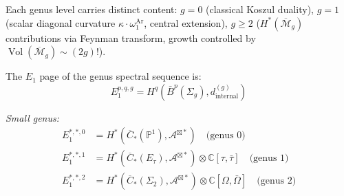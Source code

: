 \begin{remark}
\label{rem:genus-fundamental-parameter}
Each genus level carries distinct content: $g=0$ (classical Koszul
duality), $g=1$ (scalar diagonal curvature
$\kappa\cdot\omega_1^{\mathrm{Ar}}$,
central extension), $g\geq 2$ ($H^*(\overline{\mathcal{M}}_g)$
contributions via Feynman transform, growth controlled by
$\operatorname{Vol}(\overline{\mathcal{M}}_g)\sim(2g)!$).
\end{remark}

\begin{theorem}
\label{thm:e1-page-complete}
The $E_1$ page of the genus spectral sequence is:
\begin{equation}
E_1^{p,q,g} = H^q\left(\bar{B}^p(\Sigma_g), d^{(g)}_{\mathrm{internal}}\right)
\end{equation}

\emph{Small genus:}
\begin{align}
E_1^{*,*,0} &= H^*(\overline{C}_*(\mathbb{P}^1), \mathcal{A}^{\boxtimes *}) \quad \text{(genus 0)} \\
E_1^{*,*,1} &= H^*(\overline{C}_*(E_\tau), \mathcal{A}^{\boxtimes *}) \otimes \mathbb{C}[\tau, \bar{\tau}] \quad \text{(genus 1)} \\
E_1^{*,*,2} &= H^*(\overline{C}_*(\Sigma_2), \mathcal{A}^{\boxtimes *}) \otimes \mathbb{C}[\Omega, \bar{\Omega}] \quad \text{(genus 2)}
\end{align}
\end{theorem}


